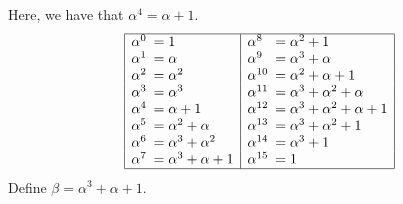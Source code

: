 \documentclass[11pt]{article}
\begin{document}
\newpage{}
  Here, we have that $\alpha^4 = \alpha + 1$.
  \[\begin{array}{|ll|ll|}\hline\begin{picture}(0,0)(0,.7)\end{picture}
    \alpha^0 \!\!\!&= 1                     & \alpha^8   \!\!\!&= \alpha^2 + 1 \\
    \alpha^1 \!\!\!&= \alpha                & \alpha^9   \!\!\!&= \alpha^3 + \alpha \\
    \alpha^2 \!\!\!&= \alpha^2              & \alpha^{10}\!\!\!&= \alpha^2 + \alpha + 1\\
    \alpha^3 \!\!\!&= \alpha^3              & \alpha^{11}\!\!\!&= \alpha^3 + \alpha^2 + \alpha\\
    \alpha^4 \!\!\!&= \alpha + 1            & \alpha^{12}\!\!\!&= \alpha^3 + \alpha^2 + \alpha + 1 \\
    \alpha^5 \!\!\!&= \alpha^2 + \alpha     & \alpha^{13}\!\!\!&= \alpha^3 + \alpha^2 + 1 \\
    \alpha^6 \!\!\!&= \alpha^3 + \alpha^2   & \alpha^{14}\!\!\!&= \alpha^3 + 1\\
    \alpha^7 \!\!\!&= \alpha^3 + \alpha + 1 & \alpha^{15}\!\!\!&= 1\\\hline
  \end{array}\]
  Define $\beta = \alpha^3+\alpha+1$.
\end{document}

